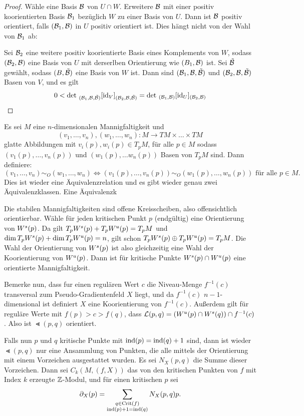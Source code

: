 \begin{proof}
    Wähle eine Basis $\mathcal{B}$ von $U \cap W$. Erweitere $\mathcal{B}$ mit einer positiv koorientierten Basis $\mathcal{B}_1$
    bezüglich $W$ zu einer Basis von $U$. Dann ist $\mathcal{B}$ positiv orientiert, falls $(\mathcal{B}_1, \mathcal{B})$ 
    in $U$ positiv orientiert ist. Dies hängt nicht von der Wahl von $\mathcal{B}_1$ ab:

    Sei $\mathcal{B}_2$ eine weitere positiv koorientierte Basis eines Komplements von $W$, sodass $(\mathcal{B}_2, \mathcal{B})$ 
    eine Basis von $U$ mit derserlben Orientierung wie $(B_1, \mathcal{B})$ ist. Sei $\tilde{\mathcal{B}}$ gewählt, sodass 
    $(B, \tilde{\mathcal{B}})$ eine Basis von $W$ ist. Dann sind $(\mathcal{B}_1, \mathcal{B}, \tilde{\mathcal{B}})$ und 
    $(\mathcal{B}_2, \mathcal{B}, \tilde{\mathcal{B}})$ Basen von $V$, und es gilt
    \[ 0 < \det \, _{(\mathcal{B}_1, \mathcal{B}, \tilde{\mathcal{B}})}[{ \operatorname{id} }_V]_{(\mathcal{B}_2, \mathcal{B}, \tilde{\mathcal{B}})} = 
        \det \, _{(\mathcal{B}_1, \mathcal{B})}[{ \operatorname{id} }_U]_{(\mathcal{B}_2, \mathcal{B})} \]
\end{proof}

\begin{definition}
    Es sei $M$ eine $n$-dimensionalen Mannigfaltigkeit und 
    \[ (v_1, \dots, v_n), (w_1, \dots, w_n) \colon M \to TM \times \dots \times TM \]
    glatte Abbildungen mit $v_i(p), w_i(p) \in T_pM$, für alle $p \in M$ sodass $(v_1(p), \dots, v_n(p))$
    und $(w_1(p), \dots w_n(p))$ Basen von $T_pM$ sind. Dann definiere:
    \[ (v_1, \dots, v_n) \sim_O (w_1, \dots, w_n) 
        \Longleftrightarrow 
            (v_1(p), \dots, v_n(p)) \sim_O (w_1(p), \dots, w_n(p)) \text{ für alle } p \in M . \]
    Dies ist wieder eine Äquivalenzrelation und es gibt wieder genau zwei Äquivalenzklassen. 
    Eine Äquivalenzk
\end{definition}

Die stabilen Mannigfaltigkeiten sind offene Kreisscheiben, also offensichtlich orientierbar. 
Wähle für jeden kritischen Punkt $p$ (endgültig) eine Orientierung von ${ W^s } (p)$. Da gilt 
$T_p { W^s } (p) + T_p { W^u } (p) = T_p M$ und $\dim T_p { W^s } (p) + \dim T_p { W^u }(p) = n$,
gilt schon $T_p { W^s } (p) \oplus T_p { W^u } (p) = T_p M$. Die Wahl der Orientierung von ${ W^s } (p)$
ist also gleichzeitig eine Wahl der Koorientierung von ${ W^u } (p)$. Dann ist für kritische Punkte 
${ W^s } (p) \cap { W^u } (p)$ eine orientierte Mannigfaltigkeit. 

Bemerke nun, dass fur einen regulären Wert $c$ die Niveau-Menge $f^{-1}(c)$ transversal zum 
Pseudo-Gradientenfeld $X$ liegt, und da $f^{-1}(c)$ $n-1$-dimensional ist definiert $X$ eine 
Koorientierung von $f^{-1}(c)$. Außerdem gilt für reguläre Werte mit $f(p) > c > f(q)$, dass 
${ \mathcal{L} } (p, q) = ({ W^u } (p) \cap { W^s } (q)) \cap f^{-1}(c)$. Also ist $\Lt (p, q)$ orientiert.

Falls nun $p$ und $q$ kritische Punkte mit ${ \operatorname{ind} } (p) = { \operatorname{ind} } (q) + 1$ sind, dann ist wieder 
$\Lt (p, q)$ nur eine Ansammlung von Punkten, die alle mittels der Orientierung mit einem Vorzeichen 
ausgestattet wurden. Es sei $N_X (p, q)$ die Summe dieser Vorzeichen. Dann sei $C_k (M, (f, X))$
das von den kritischen Punkten von $f$ mit Index $k$ erzeugte ${ \mathbb Z }$-Modul, und für einen kritischen $p$
sei
\[{ \partial }_X (p) = \sum_{\substack{ q \in { \operatorname{Crit} }(f) \\ { \operatorname{ind} } (p) + 1 = { \operatorname{ind} } (q) }} N_X(p, q)p . \]
